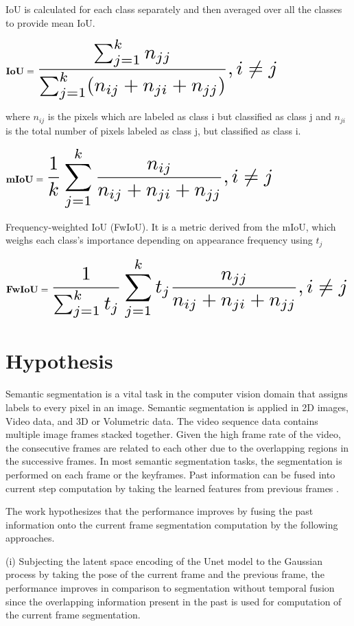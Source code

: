 	IoU is calculated for each class separately and then averaged over all the classes to provide mean IoU.  
	
	$
	{\bf IoU} = \scalemath{2}{\frac{\sum_{j=1}^{k} n_{jj}}{\sum_{j=1}^{k} (n_{ij}+n_{ji}+n_{jj})}, i \neq j }
	$

	where $ n_{ij}$ is the pixels which are labeled as class i but classified as class j and $n_{ji}$ is the total number of pixels labeled as class j, but classified as class i. \cite{84_ulku2022survey}
	
	$
	{\bf mIoU} = \scalemath{2}{\frac{1}{k} \sum_{j=1}^k \frac{n_{ij}}{n_{ij}+n_{ji}+n_{jj}},  i \neq j }
	$
	
	Frequency-weighted IoU (FwIoU). It is a metric derived from the mIoU, which weighs each class's importance depending on appearance frequency using $t_j$ \cite{84_ulku2022survey}
	
	$
	{\bf FwIoU} = \scalemath{2} {\frac{1}{\sum_{j=1}^k t_j} \sum_{j=1}^{k} t_j \frac{n_{jj}}{n_{ij}+n_{ji}+n_{jj}}, i \neq j }
	$
    
    \section{Hypothesis}
    
    Semantic segmentation is a vital task in the computer vision domain that assigns labels to every pixel in an image. Semantic segmentation is applied in 2D images, Video data, and 3D or Volumetric data. The video sequence data contains multiple image frames stacked together. Given the high frame rate of the video, the consecutive frames are related to each other due to the overlapping regions in the successive frames. In most semantic segmentation tasks, the segmentation is performed on each frame or the keyframes. Past information can be fused into current step computation by taking the learned features from previous frames \cite{78_hu2020temporally}.
    
    The work hypothesizes that the performance improves by fusing the past information onto the current frame segmentation computation by the following approaches.
    
    (i) Subjecting the latent space encoding of the Unet model to the Gaussian process by taking the pose of the current frame and the previous frame, the performance improves in comparison to segmentation without temporal fusion since the overlapping information present in the past is used for computation of the current frame segmentation.
    
